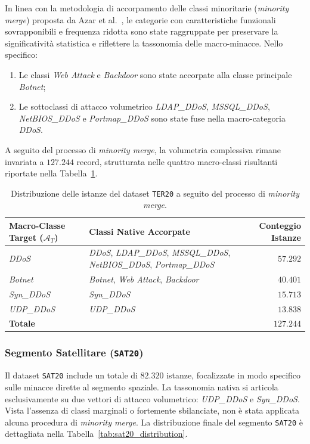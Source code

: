 In linea con la metodologia di accorpamento delle classi minoritarie (\textit{minority merge}) proposta da Azar et al.~\cite{azar2023}, le categorie con caratteristiche funzionali sovrapponibili e frequenza ridotta sono state raggruppate per preservare la significatività statistica e riflettere la tassonomia delle macro-minacce. Nello specifico:
\begin{enumerate}
    \item Le classi \textit{Web Attack} e \textit{Backdoor} sono state accorpate alla classe principale \textit{Botnet};
    \item Le sottoclassi di attacco volumetrico \textit{LDAP\_DDoS}, \textit{MSSQL\_DDoS}, \textit{NetBIOS\_DDoS} e \textit{Portmap\_DDoS} sono state fuse nella macro-categoria \textit{DDoS}.
\end{enumerate}

A seguito del processo di \textit{minority merge}, la volumetria complessiva rimane invariata a $127.244$ record, strutturata nelle quattro macro-classi risultanti riportate nella Tabella~\ref{tab:ter20_distribution}.

\begin{table}[H]
    \centering
    \small
    \caption{Distribuzione delle istanze del dataset \texttt{TER20} a seguito del processo di \textit{minority merge}.}
    \label{tab:ter20_distribution}
    \begin{tabular}{l p{6cm} r}
        \toprule
        \textbf{Macro-Classe Target ($\mathcal{A}_T$)} & \textbf{Classi Native Accorpate} & \textbf{Conteggio Istanze} \\
        \midrule
        \textit{DDoS} & \textit{DDoS}, \textit{LDAP\_DDoS}, \textit{MSSQL\_DDoS}, \textit{NetBIOS\_DDoS}, \textit{Portmap\_DDoS} & $57.292$ \\
        \textit{Botnet} & \textit{Botnet}, \textit{Web Attack}, \textit{Backdoor} & $40.401$ \\
        \textit{Syn\_DDoS} & \textit{Syn\_DDoS} & $15.713$ \\
        \textit{UDP\_DDoS} & \textit{UDP\_DDoS} & $13.838$ \\
        \hline
        \textbf{Totale} & & $\mathbf{127.244}$ \\
        \bottomrule
    \end{tabular}
\end{table}

\subsubsection{Segmento Satellitare (\texttt{SAT20})}
Il dataset \texttt{SAT20} include un totale di $82.320$ istanze, focalizzate in modo specifico sulle minacce dirette al segmento spaziale. 
La tassonomia nativa si articola esclusivamente su due vettori di attacco volumetrico: \textit{UDP\_DDoS} e \textit{Syn\_DDoS}. 
Vista l'assenza di classi marginali o fortemente sbilanciate, non è stata applicata alcuna procedura di \textit{minority merge}. 
La distribuzione finale del segmento \texttt{SAT20} è dettagliata nella Tabella~\ref{tab:sat20_distribution}.

